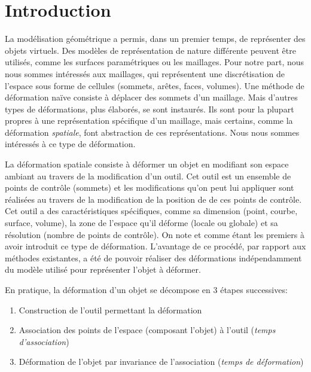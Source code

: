 
\chapter{Introduction}

\graphicspath{ {Introduction/IntroductionFigs/PNG/}
  {Introduction/IntroductionFigs/PDF/}
  {Introduction/IntroductionFigs/} }

La modélisation géométrique a permis, dans un premier temps, de représenter
des objets virtuels. Des modèles de représentation de nature différente
peuvent être utilisés, comme les surfaces paramétriques ou les maillages. Pour
notre part, nous nous sommes intéressés aux maillages, qui représentent une
discrétisation de l'espace sous forme de cellules (sommets, arêtes, faces,
volumes). Une méthode de déformation naïve consiste à déplacer des sommets
d'un maillage. Mais d'autres types de déformations, plus élaborés, se sont
instaurés. Ils sont pour la plupart propres à une représentation spécifique
d'un maillage, mais certains, comme la déformation \textit{spatiale}, font
abstraction de ces représentations. Nous nous sommes intéressés à ce type de
déformation.
	
La déformation spatiale consiste à déformer un objet en modifiant son espace
ambiant au travers de la modification d'un outil. Cet outil est un ensemble de
points de contrôle (sommets) et les modifications qu'on peut lui appliquer
sont réalisées au travers de la modification de la position de de ces points
de contrôle. Cet outil a des caractéristiques spécifiques, comme sa dimension
(point, courbe, surface, volume), la zone de l'espace qu'il déforme (locale ou
globale) et sa résolution (nombre de points de contrôle). On note \cite{Bar84}
et \cite{SP86} comme étant les premiers à avoir introduit ce type de
déformation. L'avantage de ce procédé, par rapport aux méthodes existantes, a
été de pouvoir réaliser des déformations indépendamment du modèle utilisé pour
représenter l'objet à déformer.

\newpage

En pratique, la déformation d'un objet se décompose en 3 étapes successives:
\begin{enumerate}

\item Construction de l'outil permettant la déformation

\item Association des points de l'espace (composant l'objet) à l'outil
(\textit{temps d'association})

\item Déformation de l'objet par invariance de l'association (\textit{temps de
déformation})

\end{enumerate} 

